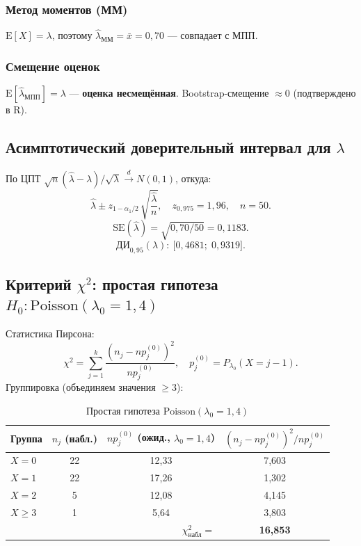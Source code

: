 \documentclass[12pt,a4paper]{article}
\newcommand{\lahat}{\hat{\lambda}}
\newcommand{\xbar}{\bar{x}}
\begin{document}
	\subsubsection*{Метод моментов (ММ)}
	$\mathrm{E}[X] = \lambda$, поэтому $\lahat_{\mathrm{ММ}} = \xbar = 0{,}70$ — совпадает с МПП.
	
	\subsubsection*{Смещение оценок}
	$\mathrm{E}[\lahat_{\mathrm{МПП}}] = \lambda$ — \textbf{оценка несмещённая}.
	Bootstrap-смещение $\approx 0$ (подтверждено в R).
	
	\subsection{Асимптотический доверительный интервал для
		\texorpdfstring{$\lambda$}{lambda}}
	
	По ЦПТ $\sqrt{n}(\lahat - \lambda)/\sqrt{\lambda} \xrightarrow{d} N(0,1)$, откуда:
	\[
	\lahat \pm z_{1-\alpha_1/2}\,\sqrt{\frac{\lahat}{n}},
	\quad z_{0{,}975} = 1{,}96, \quad n = 50.
	\]
	\[
	\mathrm{SE}(\lahat) = \sqrt{0{,}70/50} = 0{,}1183.
	\]
	\[
	\boxed{
		\mathrm{ДИ}_{0{,}95}(\lambda):\ \bigl[0{,}4681;\; 0{,}9319\bigr].
	}
	\]
	
	\subsection{Критерий \texorpdfstring{$\chi^2$}{chi2}: простая гипотеза
		\texorpdfstring{$H_0\colon\mathrm{Poisson}(\lambda_0 = 1{,}4)$}{}}
	
	Статистика Пирсона:
	\[
	\chi^2 = \sum_{j=1}^{k}\frac{(n_j - n p_j^{(0)})^2}{n p_j^{(0)}},
	\quad
	p_j^{(0)} = P_{\lambda_0}(X = j-1).
	\]
	Группировка (объединяем значения $\ge 3$):
	
	\begin{table}[H]
		\centering
		\begin{tabular}{lccc}
			\toprule
			Группа & $n_j$ (набл.) & $np_j^{(0)}$ (ожид., $\lambda_0=1{,}4$) & $(n_j - np_j^{(0)})^2/np_j^{(0)}$ \\
			\midrule
			$X=0$   & 22 & 12{,}33 &  7{,}603 \\
			$X=1$   & 22 & 17{,}26 &  1{,}302 \\
			$X=2$   &  5 & 12{,}08 &  4{,}145 \\
			$X\ge3$ &  1 &  5{,}64 &  3{,}803 \\
			\bottomrule
			\multicolumn{3}{r}{$\chi^2_{\text{набл}} =$} & \textbf{16{,}853} \\
		\end{tabular}
		\caption{Простая гипотеза $\mathrm{Poisson}(\lambda_0=1{,}4)$}
	\end{table}
	
\end{document}
